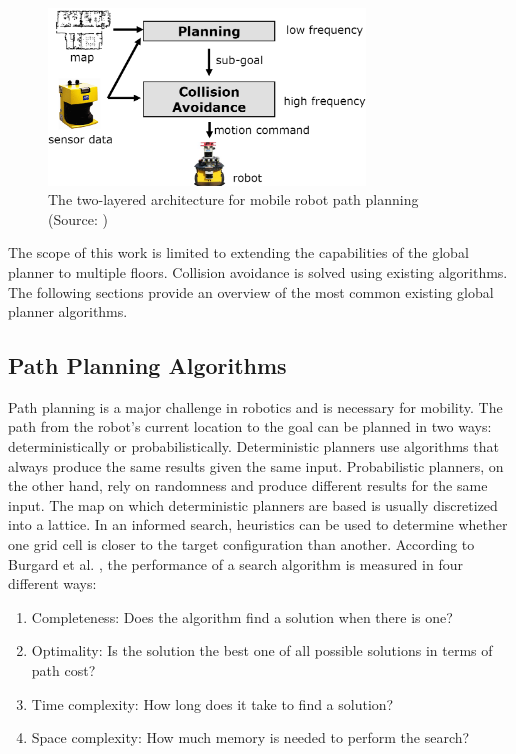 \begin{figure}[h]
    \centering \captionsetup{justification=centering}
    \includegraphics[width=0.75\textwidth]{figures/20_state_of_the_art/path_planning_two_layered_architecture.png}
    \caption[The two-layered architecture for mobile robot path planning]{The two-layered architecture for mobile robot path planning (Source: \cite{burgard_introduction_2021})}
    \label{fig:path_planning_two_layered_architecture}
\end{figure}

The scope of this work is limited to extending the capabilities of the global planner to multiple floors. Collision avoidance is solved using existing algorithms. The following sections provide an overview of the most common existing global planner algorithms. 

\subsection{Path Planning Algorithms}
Path planning is a major challenge in robotics and is necessary for mobility. The path from the robot's current location to the goal can be planned in two ways: deterministically or probabilistically. Deterministic planners use algorithms that always produce the same results given the same input. Probabilistic planners, on the other hand, rely on randomness and produce different results for the same input. The map on which deterministic planners are based is usually discretized into a lattice. In an informed search, heuristics can be used to determine whether one grid cell is closer to the target configuration than another. According to Burgard et al. \cite{burgard_introduction_2021}, the performance of a search algorithm is measured in four different ways:
\begin{enumerate}
    \item Completeness:
    Does the algorithm find a solution when there is one?
    \item Optimality:
    Is the solution the best one of all possible solutions in terms of path cost?
    \item Time complexity:
    How long does it take to find a solution?
    \item Space complexity:
    How much memory is needed to perform the search?
\end{enumerate}


